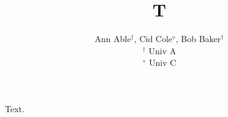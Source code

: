 \documentclass{article}
\title{T}
\author{Ann Able$^{\dag}$, Cid Cole$^{\diamond}$, Bob Baker$^{\dagger}$ \\ $^{\dagger}$ Univ A \\
$^{\diamond}$ Univ C}
\begin{document}
\maketitle
Text.
\end{document}

